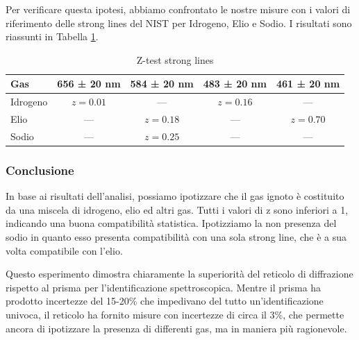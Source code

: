 \documentclass[a4paper]{article}
\begin{document}
Per verificare questa ipotesi, abbiamo confrontato le nostre misure con i valori di riferimento delle strong lines del NIST per Idrogeno, Elio e Sodio. I risultati sono riassunti in Tabella \ref{tab:z_test}.
\begin{table}[H]
\centering
\caption{Z-test strong lines}
\label{tab:z_test}
\begin{tabular}{l c c c c}
\toprule
Gas & 656 ± 20 nm & 584 ± 20 nm & 483 ± 20 nm & 461 ± 20 nm \\
\midrule
Idrogeno & $z = 0.01$ & --- & $z=0.16$ & --- \\
Elio & --- & $z=0.18$ & --- & $z=0.70$ \\
Sodio & --- & $z=0.25$ & --- & --- \\
\bottomrule
\end{tabular}
\end{table}

\subsubsection{Conclusione}
In base ai risultati dell'analisi, possiamo ipotizzare che il gas ignoto è costituito da una miscela di idrogeno, elio ed altri gas.
Tutti i valori di z sono inferiori a 1, indicando una buona compatibilità statistica. Ipotizziamo la non presenza del sodio in quanto esso presenta compatibilità con una sola strong line, che è a sua volta compatibile con l'elio.

Questo esperimento dimostra chiaramente la superiorità del reticolo di diffrazione rispetto al prisma per l'identificazione spettroscopica. Mentre il prisma ha prodotto incertezze del 15-20\% che impedivano del tutto un'identificazione univoca, il reticolo ha fornito misure con incertezze di circa il 3\%, che permette ancora di ipotizzare la presenza di differenti gas, ma in maniera più ragionevole.
\end{document}
